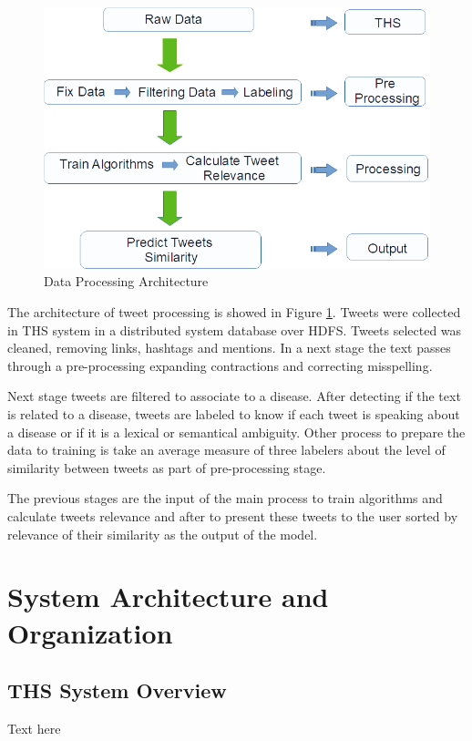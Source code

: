 \documentclass[12pt]{report}
\begin{document}
\begin{figure}[H]	
	\centering
	\includegraphics[width=150mm, scale = 1]{images/5_data_processing.png}	
	\caption{Data Processing Architecture}	
	\label{figure:data_processing}
\end{figure}

The architecture of tweet processing is showed in Figure \ref{figure:data_processing}. Tweets were collected in \ac{THS} system in a distributed system database over \ac{HDFS}. Tweets selected was cleaned, removing links, hashtags and mentions. In a next stage the text passes through a pre-processing expanding contractions and correcting misspelling.

Next stage tweets are filtered to associate to a disease. After detecting if the text is related to a disease, tweets are labeled to know if each tweet is speaking about a disease or if it is a lexical or semantical ambiguity. Other process to prepare the data to training is take an average measure of three labelers about the level of similarity between tweets as part of pre-processing stage.

The previous stages are the input of the main process to train algorithms and calculate tweets relevance and after to present these tweets to the user sorted by relevance of their similarity as the output of the model.

\chapter{System Architecture and Organization} \label{chapter 4}
\section{THS System Overview}
Text here
\end{document}
